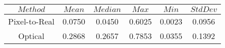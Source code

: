 \begin{table}[h]
\centering
\begin{tabular}{|c|c|c|c|c|c|}
\hline
$Method$ & $Mean$ & $Median$ & $Max$ & $Min$ & $StdDev$ \\
\hline
Pixel-to-Real & 0.0750 & 0.0450 & 0.6025 & 0.0023 & 0.0956 \\
\hline
Optical & 0.2868 & 0.2657 & 0.7853 & 0.0355 & 0.1392 \\
\hline
\end{tabular}
\end{table}

